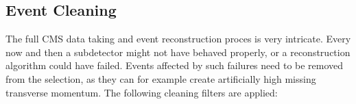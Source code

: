 % 
% 
% 

\subsection{Event Cleaning \label{sec:event_cleaning}}

The full CMS data taking and event reconstruction proces is very intricate. Every now and then a
subdetector might not have behaved properly, or a reconstruction algorithm could have failed. 
Events affected by such failures need to be removed from the selection, as they can for example
create artificially high missing transverse momentum.
The following cleaning filters are applied:

